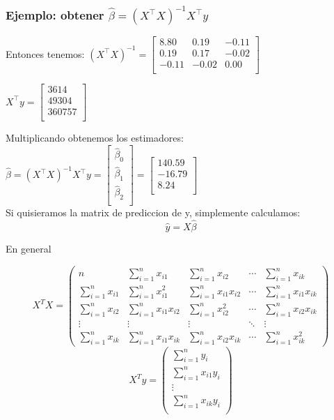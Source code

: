 \documentclass{beamer}
\begin{document}
\begin{frame}
\frametitle{Ejemplo: obtener $\hat{\beta} = (X^\top X)^{-1}X^\top y$}

Entonces tenemos: $(X^{\top}X)^{-1} = 
\begin{bmatrix}
8.80 & 0.19 & -0.11 \\
0.19 & 0.17 & -0.02 \\
-0.11 & -0.02 & 0.00 \\
\end{bmatrix}$

$X^{\top}y = 
\begin{bmatrix}
3614 \\
49304 \\
360757 \\
\end{bmatrix}$

\medskip %

Multiplicando obtenemos los estimadores:
\medskip
$\hat{\beta} = (X^{\top}X)^{-1}X^{\top}y=
\begin{bmatrix}
\hat{\beta}_0 \\
\hat{\beta}_1 \\
\hat{\beta}_2 \\
\end{bmatrix}=
\begin{bmatrix}
140.59 \\
-16.79 \\
8.24 \\
\end{bmatrix}$\\
\medskip
Si quisieramos la matrix de prediccion de y, simplemente calculamos:
\[\hat{y}=X\hat{\beta}\]
\end{frame}

\begin{frame}{En general}

\[
X^T X =
\begin{pmatrix}
n & \sum_{i=1}^{n} x_{i1} & \sum_{i=1}^{n} x_{i2} & \cdots & \sum_{i=1}^{n} x_{ik} \\
\sum_{i=1}^{n} x_{i1} & \sum_{i=1}^{n} x_{i1}^2 & \sum_{i=1}^{n} x_{i1}x_{i2} & \cdots & \sum_{i=1}^{n} x_{i1}x_{ik} \\
\sum_{i=1}^{n} x_{i2} & \sum_{i=1}^{n} x_{i1}x_{i2} & \sum_{i=1}^{n} x_{i2}^2 & \cdots & \sum_{i=1}^{n} x_{i2}x_{ik} \\
\vdots & \vdots & \vdots & \ddots & \vdots \\
\sum_{i=1}^{n} x_{ik} & \sum_{i=1}^{n} x_{i1}x_{ik} & \sum_{i=1}^{n} x_{i2}x_{ik} & \cdots & \sum_{i=1}^{n} x_{ik}^2
\end{pmatrix}
\]
    \[
 X^Ty=\begin{pmatrix}
 \sum_{i=1}^n y_i \\
 \sum_{i=1}^n x_{i1}y_i \\
 \vdots\\
 \sum_{i=1}^n x_{ik}y_i \\
 \end{pmatrix}
 \]
\end{frame}
\end{document}

